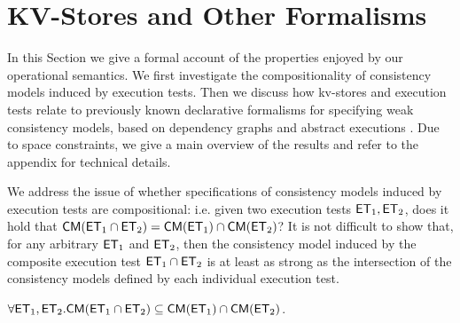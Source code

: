 \section{KV-Stores and Other Formalisms}
\label{sec:other_formalisms}

In this Section we give a formal account of the properties enjoyed by our operational 
semantics. We first investigate the compositionality of consistency models 
induced by execution tests. Then we discuss how kv-stores and execution 
tests relate to previously known declarative formalisms for specifying weak 
consistency models, based on dependency graphs \cite{adya} 
and abstract executions \cite{framework-concur}. Due to space 
constraints, we give a main overview of the results and refer to the 
appendix for technical details.


We address the issue of whether specifications of consistency models 
induced by execution tests are compositional:  i.e. given 
two execution tests $\mathsf{ET}_1, \mathsf{ET}_2$, does it hold that 
$\mathsf{CM}(\mathsf{ET}_1 \cap \mathsf{ET}_2) = \mathsf{CM}(\mathsf{ET}_1) \cap \mathsf{CM}(\mathsf{ET}_2)$? 
It is not difficult to show that, for any arbitrary $\mathsf{ET}_1$ and $\mathsf{ET}_2$, 
then the consistency model induced by the composite execution test 
$\mathsf{ET}_1 \cap \mathsf{ET}_2$ is at least as strong as the intersection of the 
consistency models defined by each individual execution test. 
\begin{proposition}
\label{prop:composite_stronger}
$\forall \mathsf{ET}_1, \mathsf{ET}_2.\mathsf{CM}(\mathsf{ET}_1 \cap \mathsf{ET}_2) \subseteq \mathsf{CM}(\mathsf{ET}_1) \cap \mathsf{CM}(\mathsf{ET}_2)$.
\end{proposition}

